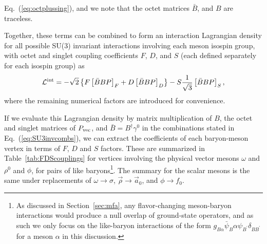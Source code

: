 \documentclass[11pt,a4paper,twoside]{carrollthesis}
\newcommand{\be}{\begin{equation}}
\newcommand{\ee}{\end{equation}}
\newcommand{\w}{\omega}
\newcommand{\reci}[1]{\frac{1}{#1}}
\begin{document}
Eq.~(\ref{eq:octplussing}), and we note that the octet matrices
$\bar{B}$, and $B$ are traceless.\par
%
Together, these terms can be combined to form an interaction
Lagrangian density for all possible SU(3) invariant interactions
involving each meson isospin group, with octet and singlet coupling
coefficients $F$, $D$, and $S$ (each defined separately for each
isospin group) as
%
\be
\label{eq:SU3intL}
{\cal L}^{\rm int} = -\sqrt{2}\left\{ F\left[ \bar{B}BP\right]_F +D
\left[ \bar{B}BP\right]_D \right\} - S\reci{\sqrt{3}} \left[
  \bar{B}BP\right]_S, \ee
%
where the remaining numerical factors are introduced for
convenience.\par
%
If we evaluate this Lagrangian density by matrix multiplication of
$B$, the octet and singlet matrices of $P_{\rm vec}$, and $\bar{B} =
B^{\dagger}\gamma^0$ in the combinations stated in
Eq.~(\ref{eq:SU3invcombs}), we can extract the coefficients of each
baryon-meson vertex in terms of $F$, $D$ and $S$ factors. These are
summarized in Table~\ref{tab:FDScouplings} for vertices involving the
physical vector mesons $\w$ and $\rho^0$ and $\phi$, for pairs of like
baryons\footnote{As discussed in Section~\ref{sec:mfa}, any
  flavor-changing meson-baryon interactions would produce a null
  overlap of ground-state operators, and as such we only focus on the
  like-baryon interactions of the form $g_{B\alpha}\bar{\psi}_B \alpha
  \psi_{B^\prime} \delta_{BB^\prime}$ for a meson $\alpha$ in this
  discussion.}.
The summary for the scalar mesons is the same under replacements of
$\omega \to \sigma$, $\vec{\rho} \to \vec{a}_0$, and $\phi \to
f_0$.\par
%
\vfill
%
\end{document}
